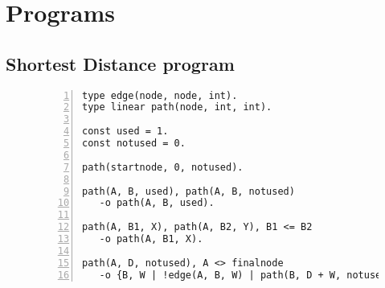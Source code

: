 
\section{Programs}

\begin{comment}
\subsection{Bipartiteness Checking program}\label{code:bichecking}

\begin{figure}[h!]
\footnotesize\begin{Verbatim}[numbers=left]
type edge(node, node).
type linear visit(node, int).
type linear unchecked(node).
type linear checked(node, int).
type linear fail(node).

fun next(int X) : int = if X <> 1 then 1 else 2 end.

visit(@1, 1).

visit(A, P), unchecked(A)
   -o {B | !edge(A, B) | visit(B, next(P))}, checked(A, P).

visit(A, P), checked(A, P) -o checked(A, P).
visit(A, P1), checked(A, P2), P1 <> P2 -o fail(A).
visit(A, P), fail(A) -o fail(A).
\end{Verbatim}
\end{figure}
\normalsize
\end{comment}

\subsection{Shortest Distance program}\label{code:shortest_path}

\begin{figure}[h!]
\footnotesize\begin{Verbatim}[numbers=left]
type edge(node, node, int).
type linear path(node, int, int).

const used = 1.
const notused = 0.

path(startnode, 0, notused).

path(A, B, used), path(A, B, notused)
   -o path(A, B, used).

path(A, B1, X), path(A, B2, Y), B1 <= B2
   -o path(A, B1, X).

path(A, D, notused), A <> finalnode
   -o {B, W | !edge(A, B, W) | path(B, D + W, notused)}, path(A, D, used).
\end{Verbatim}
\end{figure}
\normalsize

